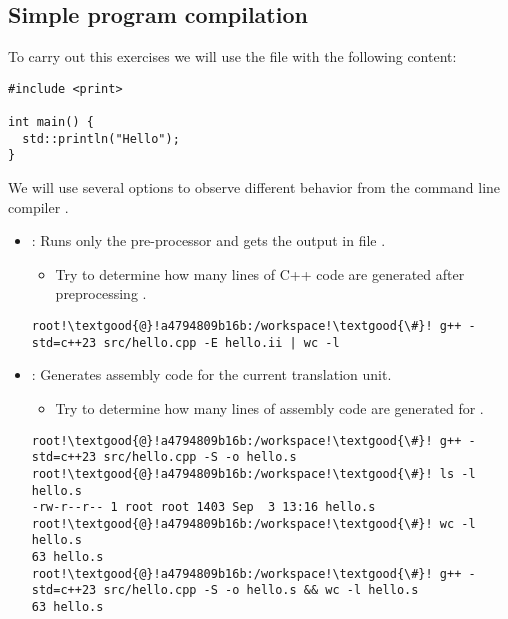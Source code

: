 \subsection{Simple program compilation}

To carry out this exercises we will use the file 
with the following content:

\begin{lstlisting}
#include <print>

int main() {
  std::println("Hello");
}
\end{lstlisting}

We will use several options to observe different behavior from the command line
compiler 
.

\begin{itemize}
  \item {}: 
  Runs only the pre-processor and gets the output in file .
    \begin{itemize}
      \item Try to determine how many lines of C++ code are generated
            after preprocessing .
    \end{itemize}
\begin{lstlisting}[style=terminal,escapechar=!]
root!\textgood{@}!a4794809b16b:/workspace!\textgood{\#}! g++ -std=c++23 src/hello.cpp -E hello.ii | wc -l
\end{lstlisting}


  \item {}:
  Generates assembly code for the current translation unit.
    \begin{itemize}
      \item Try to determine how many lines of assembly code are generated
            for .
    \end{itemize}
\begin{lstlisting}[style=terminal,escapechar=!]
root!\textgood{@}!a4794809b16b:/workspace!\textgood{\#}! g++ -std=c++23 src/hello.cpp -S -o hello.s
root!\textgood{@}!a4794809b16b:/workspace!\textgood{\#}! ls -l hello.s
-rw-r--r-- 1 root root 1403 Sep  3 13:16 hello.s
root!\textgood{@}!a4794809b16b:/workspace!\textgood{\#}! wc -l hello.s 
63 hello.s
root!\textgood{@}!a4794809b16b:/workspace!\textgood{\#}! g++ -std=c++23 src/hello.cpp -S -o hello.s && wc -l hello.s 
63 hello.s
\end{lstlisting}


\end{itemize}
